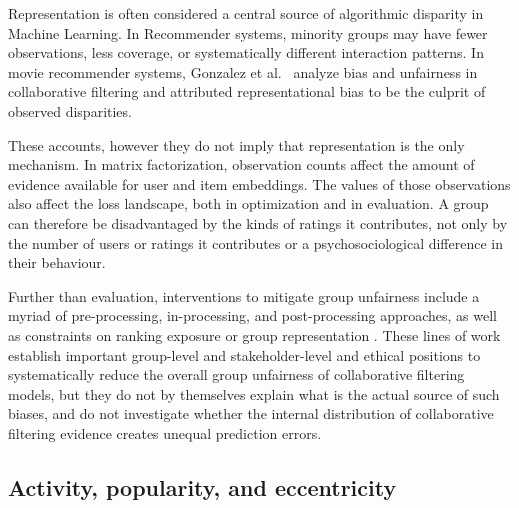 \documentclass[11pt]{article}
\begin{document}
Representation is often considered a central source of algorithmic disparity in Machine Learning. In Recommender systems, minority groups may have
fewer observations, less coverage, or systematically different interaction
patterns. In movie recommender systems, Gonzalez et al.~\cite{gonzalez2022} analyze bias and
unfairness in collaborative filtering and attributed representational bias to be the culprit of observed disparities.

These accounts, however they do not imply that representation is the only mechanism. In matrix factorization, observation
counts affect the amount of evidence available for user and item embeddings.
The values of those observations also affect the loss landscape, both in optimization and in evaluation. A group can
therefore be disadvantaged by the kinds of ratings it contributes, not only by
the number of users or ratings it contributes or a psychosociological difference in their behaviour. 

Further than evaluation, interventions to mitigate group unfairness include a myriad of pre-processing, in-processing,
and post-processing approaches, as well as constraints on ranking exposure or
group representation \cite{kamishima2012,hardt2016,celis2019}. These lines of
work establish important group-level and stakeholder-level and ethical positions to systematically reduce the overall group unfairness of collaborative filtering models, but they
do not by themselves explain what is the actual source of such biases, and do not investigate whether the internal distribution of collaborative
filtering evidence creates unequal prediction errors.

\subsection{Activity, popularity, and eccentricity}
\end{document}

